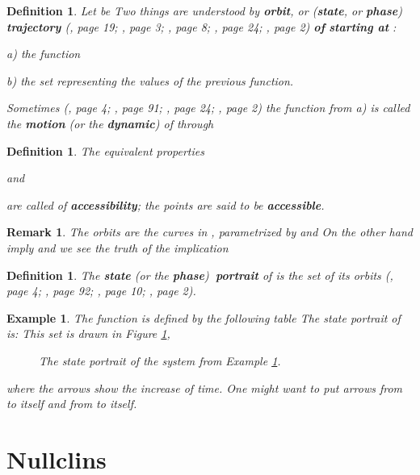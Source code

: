 \documentclass[12pt]{article}\usepackage{amsmath}
\newtheorem{definition}[theorem]{Definition}
\newtheorem{example}[theorem]{Example}
\newtheorem{remark}[theorem]{Remark}
\begin{document}
\begin{definition}
Let be  Two things are understood by \textbf{orbit}, or
(\textbf{state}, or \textbf{phase}) \textbf{trajectory} (\cite{bib4}, page 19;
\cite{bib3}, page 3; \cite{bib1}, page 8; \cite{bib2}, page 24; \cite{bib5},
page 2) \textbf{of}  \textbf{starting at} :

a) the function 

b) the set  representing
the values of the previous function.

Sometimes (\cite{bib3}, page 4; \cite{bib6}, page 91; \cite{bib2}, page 24;
\cite{bib5}, page 2) the function from a) is called the \textbf{motion} (or
the \textbf{dynamic}) of  through 
\end{definition}

\begin{definition}
The equivalent properties

and

are called of \textbf{accessibility}; the points  are said to be \textbf{accessible}.
\end{definition}

\begin{remark}
\label{Rem32}The orbits are the curves in , parametrized by
 and  On the other hand  
imply  and we see the truth of
the implication

\end{remark}

\begin{definition}
The \textbf{state} (or the \textbf{phase})\textbf{\ portrait} of 
is the set of its orbits (\cite{bib3}, page 4; \cite{bib6}, page 92;
\cite{bib1}, page 10; \cite{bib5}, page 2).
\end{definition}

\begin{example}
\label{Exa34}The function  is
defined by the following table
The state portrait of  is:
This set is drawn in Figure \ref{ph1},\begin{figure}
[ptb]
\begin{center}
\caption{The state portrait of the system from Example \ref{Exa34}.}\label{ph1}\end{center}
\end{figure}
where the arrows show the increase of time. One might want to put arrows from
 to itself and from  to itself.
\end{example}

\section{Nullclins}
\end{document}
